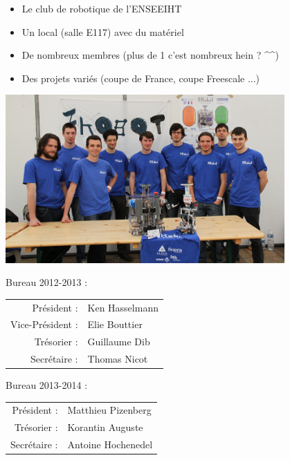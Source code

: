 \begin{frame}
   \begin{itemize}
      \item Le club de robotique de l'ENSEEIHT
      \item Un local (salle E117) avec du matériel
      \item De nombreux membres (plus de 1 c'est nombreux hein ? \^{}\^{})
      \item Des projets variés (coupe de France, coupe Freescale ...)
   \end{itemize}

   \begin{center}
      \includegraphics[width=0.8\textwidth]{../images/groupe.jpg}
   \end{center}
\end{frame}

\begin{frame}
Bureau 2012-2013 :\\
   \begin{tabular}{rl}
      Président : & Ken Hasselmann \\
      Vice-Président : & Elie Bouttier \\
      Trésorier : & Guillaume Dib \\
      Secrétaire : & Thomas Nicot \\
   \end{tabular}

\vspace{1em}
Bureau 2013-2014 :\\
   \begin{tabular}{rl}
      Président : & Matthieu Pizenberg \\
      Trésorier : & Korantin Auguste \\
      Secrétaire : & Antoine Hochenedel \\
   \end{tabular}
\end{frame}
